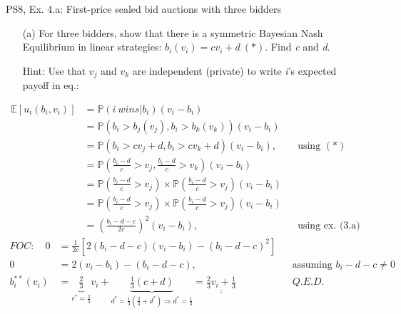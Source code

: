 \begin{frame}{PS8, Ex. 4.a: First-price sealed bid auctions with three bidders}
    \begin{itemize}
      \item[(a)] For three bidders, show that there is a symmetric Bayesian Nash Equilibrium in linear strategies: $b_i(v_i) = cv_i + d\ (*)$. Find \textit{c} and \textit{d}.
      \item[Hint:] Use that $v_j$ and $v_k$ are independent (private) to write \textit{i}'s expected payoff in eq.:
    \end{itemize}
    \vspace{-10pt}
    \begin{align*}
      \mathbb{E}[u_i(b_i,v_i)]
      &=\mathbb{P}(i\ wins|b_i)(v_i-b_i)\\
      &=\mathbb{P}\left(b_i>b_j(v_j),b_i>b_k(v_k)\right)(v_i-b_i)\\
      &=\mathbb{P}(b_i>cv_j+d,b_i>cv_k+d)(v_i-b_i),&&\text{using }(*)\\
      &=\mathbb{P}\left(\frac{b_i-d}{c}>v_j,\frac{b_i-d}{c}>v_k\right)(v_i-b_i)\\
      &=\mathbb{P}\left(\frac{b_i-d}{c}>v_j\right)\times\mathbb{P}\left(\frac{b_i-d}{c}>v_j\right)(v_i-b_i)\\
      &=\mathbb{P}\left(\frac{b_i-d}{c}>v_j\right)\times\mathbb{P}\left(\frac{b_i-d}{c}>v_j\right)(v_i-b_i)\\
      &=\left(\frac{b_i-d-c}{2c}\right)^2(v_i-b_i),&&\text{using ex. (3.a)}
    \end{align*}
    \vspace{-8pt}
    \begin{align*}
      FOC:\quad   0&=\frac{1}{2c}[2(b_i-d-c)(v_i-b_i)-(b_i-d-c)^2]\\
                  0&=2(v_i-b_i)-(b_i-d-c),&&\text{assuming }b_i-d-c\neq0\\
      b_i^{**}(v_i)&=\underbrace{\frac{2}{3}}_{c^{*}=\frac{2}{3}}v_i+\underbrace{\frac{1}{3}(c+d)}_{d^{*}=\frac{1}{3}\left(\frac{2}{3}+d^{*}\right)\Rightarrow d^{*}=\frac{1}{3}}=\underline{\underline{\frac{2}{3}v_i+\frac{1}{3}}}&&Q.E.D.
    \end{align*}
    \vfill\null
\end{frame}


